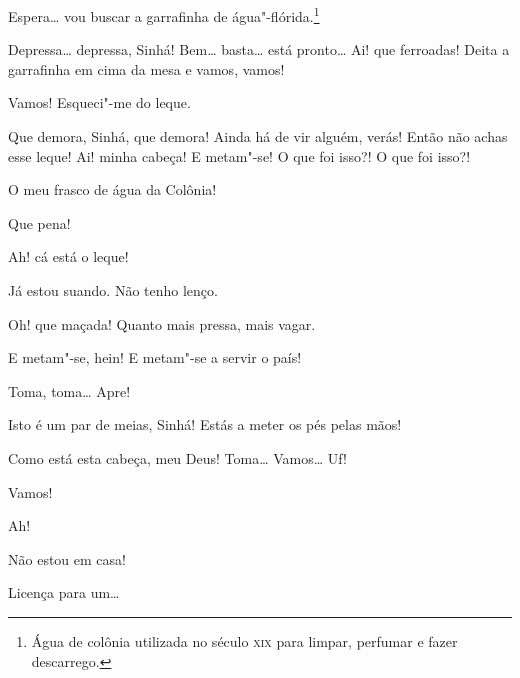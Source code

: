 \begin{linenumbers}
 Espera\ldots{} vou buscar a garrafinha de água"-flórida.\footnote{
Água de colônia utilizada no século \textsc{xix} para limpar, perfumar e fazer
descarrego.}

 Depressa\ldots{} depressa, Sinhá!  Bem\ldots{} basta\ldots{} está
pronto\ldots{} Ai! que ferroadas! Deita a garrafinha em cima da mesa e vamos,
vamos! 

 Vamos!  Esqueci"-me do leque.

  Que demora, Sinhá, que demora!
Ainda há de vir alguém, verás! 
Então não achas esse leque! Ai! minha cabeça! E metam"-se!
 O que foi
isso?! O que foi isso?! 

  O meu frasco de água da Colônia!

  Que pena!

  Ah! cá está o leque! 

 Já estou suando.  Não tenho
lenço.

 Oh! que maçada! Quanto mais pressa, mais vagar. 

 E metam"-se, hein! E metam"-se a servir o país!

  Toma, toma\ldots{} Apre! 

 Isto é um par de meias, Sinhá! Estás a meter os pés pelas
mãos! 

 Como está esta cabeça, meu Deus!  Toma\ldots{} Vamos\ldots{} Uf!

 Vamos! 

 Ah!

  Não estou em casa!

  Licença para
um\ldots{}



\end{linenumbers}
